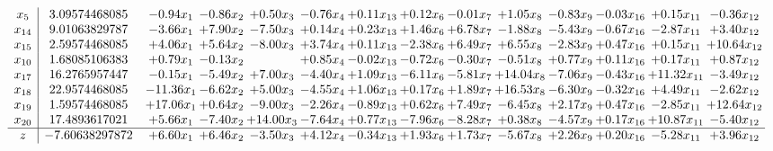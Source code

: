\documentclass[8pt]{article}
\begin{document}
\[\begin{array}{c| c c@{\hskip 2pt} c@{\hskip 2pt} c@{\hskip 2pt} c@{\hskip 2pt} c@{\hskip 2pt} c@{\hskip 2pt} c@{\hskip 2pt} c@{\hskip 2pt} c@{\hskip 2pt} c@{\hskip 2pt} c@{\hskip 2pt} c@{\hskip 2pt} }
 x_{5}   &  3.09574468085 & -0.94 x_{1} & -0.86 x_{2} & +  0.50 x_{3} & -0.76 x_{4} & +  0.11 x_{13} & +  0.12 x_{6} & -0.01 x_{7} & +  1.05 x_{8} & -0.83 x_{9} & -0.03 x_{16} & +  0.15 x_{11} & -0.36 x_{12}\\
 x_{14}   &  9.01063829787 & -3.66 x_{1} & +  7.90 x_{2} & -7.50 x_{3} & +  0.14 x_{4} & +  0.23 x_{13} & +  1.46 x_{6} & +  6.78 x_{7} & -1.88 x_{8} & -5.43 x_{9} & -0.67 x_{16} & -2.87 x_{11} & +  3.40 x_{12}\\
 x_{15}   &  2.59574468085 & +  4.06 x_{1} & +  5.64 x_{2} & -8.00 x_{3} & +  3.74 x_{4} & +  0.11 x_{13} & -2.38 x_{6} & +  6.49 x_{7} & +  6.55 x_{8} & -2.83 x_{9} & +  0.47 x_{16} & +  0.15 x_{11} & + 10.64 x_{12}\\
 x_{10}   &  1.68085106383 & +  0.79 x_{1} & -0.13 x_{2} &   & +  0.85 x_{4} & -0.02 x_{13} & -0.72 x_{6} & -0.30 x_{7} & -0.51 x_{8} & +  0.77 x_{9} & +  0.11 x_{16} & +  0.17 x_{11} & +  0.87 x_{12}\\
 x_{17}   &  16.2765957447 & -0.15 x_{1} & -5.49 x_{2} & +  7.00 x_{3} & -4.40 x_{4} & +  1.09 x_{13} & -6.11 x_{6} & -5.81 x_{7} & + 14.04 x_{8} & -7.06 x_{9} & -0.43 x_{16} & + 11.32 x_{11} & -3.49 x_{12}\\
 x_{18}   &  22.9574468085 & -11.36 x_{1} & -6.62 x_{2} & +  5.00 x_{3} & -4.55 x_{4} & +  1.06 x_{13} & +  0.17 x_{6} & +  1.89 x_{7} & + 16.53 x_{8} & -6.30 x_{9} & -0.32 x_{16} & +  4.49 x_{11} & -2.62 x_{12}\\
 x_{19}   &  1.59574468085 & + 17.06 x_{1} & +  0.64 x_{2} & -9.00 x_{3} & -2.26 x_{4} & -0.89 x_{13} & +  0.62 x_{6} & +  7.49 x_{7} & -6.45 x_{8} & +  2.17 x_{9} & +  0.47 x_{16} & -2.85 x_{11} & + 12.64 x_{12}\\
 x_{20}   &  17.4893617021 & +  5.66 x_{1} & -7.40 x_{2} & + 14.00 x_{3} & -7.64 x_{4} & +  0.77 x_{13} & -7.96 x_{6} & -8.28 x_{7} & +  0.38 x_{8} & -4.57 x_{9} & +  0.17 x_{16} & + 10.87 x_{11} & -5.40 x_{12}\\
\hline
z    &  -7.60638297872 & +  6.60 x_{1} & +  6.46 x_{2} & -3.50 x_{3} & +  4.12 x_{4} & -0.34 x_{13} & +  1.93 x_{6} & +  1.73 x_{7} & -5.67 x_{8} & +  2.26 x_{9} & +  0.20 x_{16} & -5.28 x_{11} & +  3.96 x_{12}\\
\end{array}\]
\end{document}
